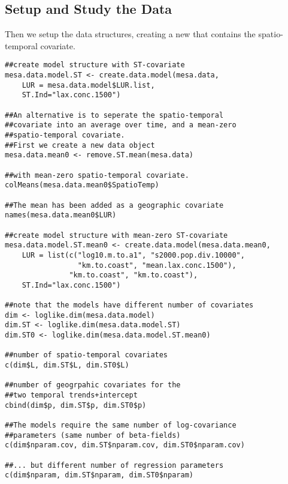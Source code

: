 \subsection{Setup and Study the Data}
Then we setup the data structures, creating a new  
that contains the spatio\hyp{}temporal covariate.
\vspace*{-0.5\baselineskip}
\begin{verbatim}
##create model structure with ST-covariate
mesa.data.model.ST <- create.data.model(mesa.data,
    LUR = mesa.data.model$LUR.list, 
    ST.Ind="lax.conc.1500")

##An alternative is to seperate the spatio-temporal 
##covariate into an average over time, and a mean-zero 
##spatio-temporal covariate.
##First we create a new data object
mesa.data.mean0 <- remove.ST.mean(mesa.data)

##with mean-zero spatio-temporal covariate.
colMeans(mesa.data.mean0$SpatioTemp)

##The mean has been added as a geographic covariate
names(mesa.data.mean0$LUR)

##create model structure with mean-zero ST-covariate
mesa.data.model.ST.mean0 <- create.data.model(mesa.data.mean0,
    LUR = list(c("log10.m.to.a1", "s2000.pop.div.10000",
                 "km.to.coast", "mean.lax.conc.1500"),  
               "km.to.coast", "km.to.coast"), 
    ST.Ind="lax.conc.1500")

##note that the models have different number of covariates
dim <- loglike.dim(mesa.data.model)
dim.ST <- loglike.dim(mesa.data.model.ST)
dim.ST0 <- loglike.dim(mesa.data.model.ST.mean0)

##number of spatio-temporal covariates
c(dim$L, dim.ST$L, dim.ST0$L)

##number of geogrpahic covariates for the 
##two temporal trends+intercept
cbind(dim$p, dim.ST$p, dim.ST0$p)

##The models require the same number of log-covariance 
##parameters (same number of beta-fields)
c(dim$nparam.cov, dim.ST$nparam.cov, dim.ST0$nparam.cov)

##... but different number of regression parameters
c(dim$nparam, dim.ST$nparam, dim.ST0$nparam)
\end{verbatim}


